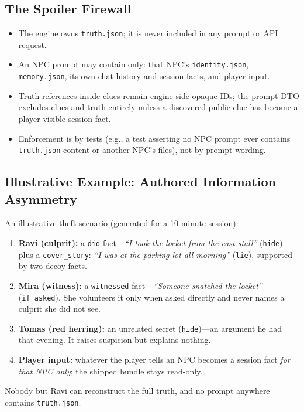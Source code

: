 \documentclass[11pt,a4paper]{article}
\begin{document}
\subsection{The Spoiler Firewall}
\begin{itemize}
    \item The engine owns \texttt{truth.json}; it is never included in any prompt or API request.
    \item An NPC prompt may contain only: that NPC's \texttt{identity.json}, \texttt{memory.json}, its own chat history and session facts, and player input.
    \item Truth references inside clues remain engine-side opaque IDs; the prompt DTO excludes clues and truth entirely unless a discovered public clue has become a player-visible session fact.
    \item Enforcement is by tests (e.g., a test asserting no NPC prompt ever contains \texttt{truth.json} content or another NPC's files), not by prompt wording.
\end{itemize}

\subsection{Illustrative Example: Authored Information Asymmetry}
An illustrative theft scenario (generated for a 10-minute session):
\begin{enumerate}
    \item \textbf{Ravi (culprit):} a \texttt{did} fact---\emph{``I took the locket from the east stall''} (\texttt{hide})---plus a \texttt{cover\_story}: \emph{``I was at the parking lot all morning''} (\texttt{lie}), supported by two decoy facts.
    \item \textbf{Mira (witness):} a \texttt{witnessed} fact---\emph{``Someone snatched the locket''} (\texttt{if\_asked}). She volunteers it only when asked directly and never names a culprit she did not see.
    \item \textbf{Tomas (red herring):} an unrelated secret (\texttt{hide})---an argument he had that evening. It raises suspicion but explains nothing.
    \item \textbf{Player input:} whatever the player tells an NPC becomes a session fact \emph{for that NPC only}; the shipped bundle stays read-only.
\end{enumerate}
Nobody but Ravi can reconstruct the full truth, and no prompt anywhere contains \texttt{truth.json}.

\end{document}
